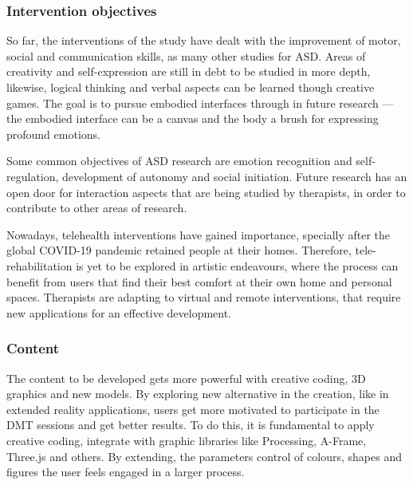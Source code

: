 \documentclass[a4paper,fleqn]{cas-sc}
\begin{document}
\subsubsection{Intervention objectives}

So far, the interventions of the study have dealt with the improvement of motor, social and communication skills, as many other studies for ASD. Areas of creativity and self-expression are still in debt to be studied in more depth, likewise, logical thinking and verbal aspects can be learned though creative games. The goal is to pursue embodied interfaces through in future research — the embodied interface can be a canvas and the body a brush for expressing profound emotions.

Some common objectives of ASD research are emotion recognition and self-regulation, development of autonomy and social initiation. Future research has an open door for interaction aspects that are being studied by therapists, in order to contribute to other areas of research.

Nowadays, telehealth interventions have gained importance, specially after the global COVID-19 pandemic retained people at their homes. Therefore, tele-rehabilitation is yet to be explored in artistic endeavours, where the process can benefit from users that find their best comfort at their own home and personal spaces. Therapists are adapting to virtual and remote interventions, that require new applications for an effective development.


\subsubsection{Content}

The content to be developed gets more powerful with creative coding, 3D graphics and new models. By exploring new alternative in the creation, like in extended reality applications, users get more motivated to participate in the DMT sessions and get better results. To do this, it is fundamental to apply creative coding, integrate with graphic libraries like Processing, A-Frame, Three.js and others. By extending, the parameters control of colours, shapes and figures the user feels engaged in a larger process.
\end{document}
